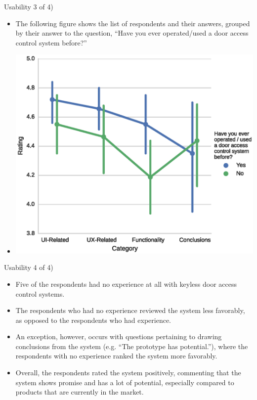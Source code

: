 \begin{frame}{Usability 3 of 4)}
\begin{itemize}
    \item<1-> The following figure shows the list of respondents and their answers, grouped by their answer to the question, ``Have you ever operated/used a door access control system before?''
    \item<2-> \includegraphics[scale=0.7]{tech-non-tech.eps}
\end{itemize}
\end{frame}

\begin{frame}{Usability 4 of 4)}
\begin{itemize}
    \item<1-> Five of the respondents had no experience at all with keyless door access control systems.
    \item<2-> The respondents who had no experience reviewed the system less favorably, as opposed to the respondents who had experience.
    \item<3-> An exception, however, occurs with questions pertaining to drawing conclusions from the system (e.g. ``The prototype has potential.''), where the respondents with no experience ranked the system more favorably.
    \item<4-> Overall, the respondents rated the system positively, commenting that the system shows promise and has a lot of potential, especially compared to products that are currently in the market.
\end{itemize}
\end{frame}


